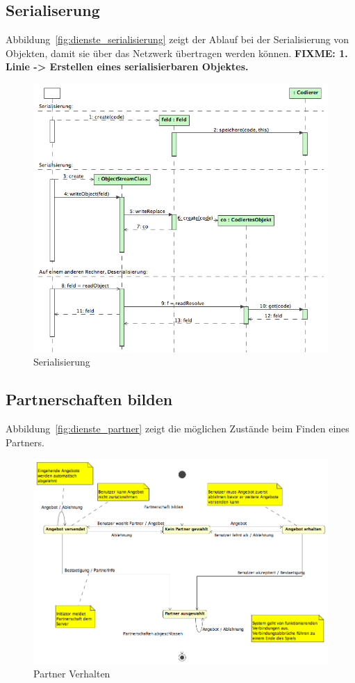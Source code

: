 \documentclass[12pt,halfparskip]{scrartcl}
\begin{document}
\subsection{Serialiserung} %
\label{sub:serialiserung}
Abbildung~\vref{fig:dienste_serialisierung} zeigt der Ablauf bei der Serialisierung von Objekten, damit sie über das Netzwerk übertragen werden können. \textbf{FIXME: 1. Linie -> Erstellen eines serialisierbaren Objektes.}
\begin{figure}[h]
	\centering
	\includegraphics[width=\textwidth]{dienste_serialisierung}
	\caption{Serialisierung}
	\label{fig:dienste_serialisierung}
\end{figure}

\subsection{Partnerschaften bilden} %
\label{sub:partnerschaften_bilden}
Abbildung~\vref{fig:dienste_partner} zeigt die möglichen Zustände beim Finden eines Partners.
\begin{figure}[h]
	\centering
	\includegraphics[width=\textwidth]{dienste_partner}
	\caption{Partner Verhalten}
	\label{fig:dienste_partner}
\end{figure}
\end{document}
